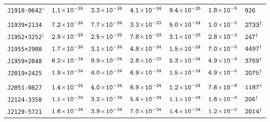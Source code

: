\begin{longtable}{ l | c | c | c | c | c | l }
\scriptsize{\tt{J1918-0642}$^{\diamond}$} & \scriptsize{$\tt{1.1\!\times\!10^{-24}}$} &
\scriptsize{$\tt{3.3\!\times\!10^{-24}}$} & \scriptsize{$\tt{4.1\!\times\!10^{-24}}$} &\scriptsize{$\tt{9.4\!\times\!10^{-25}}$} &
\scriptsize{$\tt{1.8\!\times\!10^{-5}}$} & \scriptsize{\tt{926}} \\[-16pt] 
\\[-20pt]
\scriptsize{\tt{J1939+2134}} & \scriptsize{$\tt{7.2\!\times\!10^{-24}}$} & \scriptsize{$\tt{7.7\!\times\!10^{-24}}$} &
\scriptsize{$\tt{3.3\!\times\!10^{-23}}$} & \scriptsize{$\tt{5.0\!\times\!10^{-24}}$} & \scriptsize{$\tt{1.0\!\times\!10^{-5}}$} &
\scriptsize{$\tt{2733^{\dagger}}$} \\[-16pt]
\scriptsize{\tt{J1952+3252}$^{\ddagger}$} & \scriptsize{$\tt{2.9\!\times\!10^{-23}}$} &
\scriptsize{$\tt{2.5\!\times\!10^{-22}}$} & \scriptsize{$\tt{7.8\!\times\!10^{-23}}$} & \scriptsize{$\tt{3.1\!\times\!10^{-23}}$}
& \scriptsize{$\tt{2.8\!\times\!10^{-2}}$} & \scriptsize{$\tt{247^{\dagger}}$} \\[-16pt] 
\scriptsize{\tt{J1955+2908}} & \scriptsize{$\tt{1.7\!\times\!10^{-24}}$} & \scriptsize{$\tt{3.1\!\times\!10^{-24}}$} &
\scriptsize{$\tt{4.8\!\times\!10^{-24}}$} & \scriptsize{$\tt{1.5\!\times\!10^{-24}}$} & \scriptsize{$\tt{7.0\!\times\!10^{-5}}$} &
\scriptsize{$\tt{4497^{\dagger}}$} \\[-16pt] 
\scriptsize{\tt{J1959+2048}} & \scriptsize{$\tt{6.2\!\times\!10^{-24}}$} & \scriptsize{$\tt{9.9\!\times\!10^{-24}}$} &
\scriptsize{$\tt{2.8\!\times\!10^{-23}}$} & \scriptsize{$\tt{5.3\!\times\!10^{-24}}$} & \scriptsize{$\tt{4.9\!\times\!10^{-6}}$} &
\scriptsize{$\tt{3769^{\dagger}}$} \\[-16pt] 
\scriptsize{\tt{J2019+2425}} & \scriptsize{$\tt{1.9\!\times\!10^{-24}}$} & \scriptsize{$\tt{4.0\!\times\!10^{-24}}$} &
\scriptsize{$\tt{6.9\!\times\!10^{-24}}$} & \scriptsize{$\tt{1.5\!\times\!10^{-24}}$} & \scriptsize{$\tt{4.9\!\times\!10^{-6}}$} &
\scriptsize{$\tt{2075^{\dagger}}$} \\[-16pt] 
\\[-20pt]
\scriptsize{\tt{J2051-0827}} & \scriptsize{$\tt{1.4\!\times\!10^{-24}}$} & \scriptsize{$\tt{4.0\!\times\!10^{-24}}$} &
\scriptsize{$\tt{6.9\!\times\!10^{-24}}$} & \scriptsize{$\tt{1.2\!\times\!10^{-24}}$} & \scriptsize{$\tt{7.6\!\times\!10^{-6}}$} &
\scriptsize{$\tt{1187^{\dagger}}$} \\[-16pt]
\scriptsize{\tt{J2124-3358}} & \scriptsize{$\tt{1.1\!\times\!10^{-24}}$} &
\scriptsize{$\tt{3.2\!\times\!10^{-24}}$} & \scriptsize{$\tt{5.4\!\times\!10^{-24}}$} & \scriptsize{$\tt{1.1\!\times\!10^{-24}}$}
& \scriptsize{$\tt{1.6\!\times\!10^{-6}}$} & \scriptsize{$\tt{206^{\dagger}}$} \\[-16pt] 
\scriptsize{\tt{J2129-5721}} & \scriptsize{$\tt{1.6\!\times\!10^{-24}}$} & \scriptsize{$\tt{3.9\!\times\!10^{-24}}$} &
\scriptsize{$\tt{7.0\!\times\!10^{-24}}$} & \scriptsize{$\tt{1.4\!\times\!10^{-24}}$} & \scriptsize{$\tt{1.2\!\times\!10^{-5}}$} &
\scriptsize{$\tt{2014^{\dagger}}$} \\[-16pt] 

\end{longtable}
